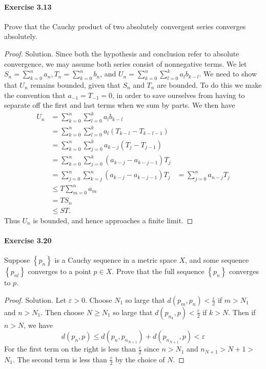 \documentclass{article}
\theoremstyle{definition}
\begin{document}
\paragraph{Exercise 3.13} Prove that the Cauchy product of two absolutely convergent series converges absolutely.
\begin{proof}
    Solution. Since both the hypothesis and conclusion refer to absolute convergence, we may assume both series consist of nonnegative terms. We let $S_n=\sum_{k=0}^n a_n, T_n=\sum_{k=0}^n b_n$, and $U_n=\sum_{k=0}^n \sum_{l=0}^k a_l b_{k-l}$. We need to show that $U_n$ remains bounded, given that $S_n$ and $T_n$ are bounded. To do this we make the convention that $a_{-1}=T_{-1}=0$, in order to save ourselves from having to separate off the first and last terms when we sum by parts. We then have
$$
\begin{aligned}
U_n &=\sum_{k=0}^n \sum_{l=0}^k a_l b_{k-l} \\
&=\sum_{k=0}^n \sum_{l=0}^k a_l\left(T_{k-l}-T_{k-l-1}\right) \\
&=\sum_{k=0}^n \sum_{j=0}^k a_{k-j}\left(T_j-T_{j-1}\right) \\
&=\sum_{k=0}^n \sum_{j=0}^k\left(a_{k-j}-a_{k-j-1}\right) T_j \\
&=\sum_{j=0}^n \sum_{k=j}^n\left(a_{k-j}-a_{k-j-1}\right) T_j
&=\sum_{j=0}^n a_{n-j} T_j \\
&\leq T \sum_{m=0}^n a_m \\
&=T S_n \\
&\leq S T .
\end{aligned}
$$
Thus $U_n$ is bounded, and hence approaches a finite limit.

\end{proof}


\paragraph{Exercise 3.20} Suppose $\left\{p_{n}\right\}$ is a Cauchy sequence in a metric space $X$, and some sequence $\left\{p_{n l}\right\}$ converges to a point $p \in X$. Prove that the full sequence $\left\{p_{n}\right\}$ converges to $p$.
\begin{proof}
    Solution. Let $\varepsilon>0$. Choose $N_1$ so large that $d\left(p_m, p_n\right)<\frac{\varepsilon}{2}$ if $m>N_1$ and $n>N_1$. Then choose $N \geq N_1$ so large that $d\left(p_{n_k}, p\right)<\frac{\varepsilon}{2}$ if $k>N$. Then if $n>N$, we have
$$
d\left(p_n, p\right) \leq d\left(p_n, p_{n_{N+1}}\right)+d\left(p_{n_{N+1}}, p\right)<\varepsilon
$$
For the first term on the right is less than $\frac{\varepsilon}{2}$ since $n>N_1$ and $n_{N+1}>N+1>$ $N_1$. The second term is less than $\frac{\varepsilon}{2}$ by the choice of $N$.
\end{proof}
\end{document}
